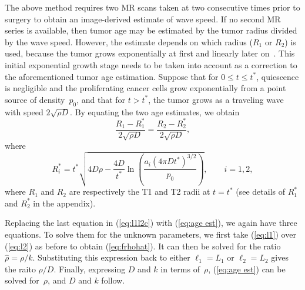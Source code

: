 \documentclass{aims}
\numberwithin{equation}{section}
\begin{document}
The above method requires two MR scans taken at two consecutive times
prior to surgery to obtain an image-derived estimate of wave speed. If no
second MR series is available, then tumor age may be estimated by the
tumor radius divided by the wave speed. However, the estimate depends on
which radius ($R_{1}$ or $R_{2}$) is used, because the tumor grows
exponentially at first and linearly later on~\cite{Kuang}. This
initial exponential growth stage needs to be taken into account as
a correction to the aforementioned tumor age estimation.  Suppose that for
$0\le t\le t^*$, quiescence is negligible and the proliferating cancer cells grow
exponentially from a point source of density~$p_0$, and that for  $t > t^*$,
the tumor grows as a traveling wave with speed $2\sqrt{\rho D}$. 
By equating the two age estimates, we obtain
\begin{equation}
\label{eq:age est}
\frac{R_1-R_1^*}{2\sqrt{\rho D}} =  \frac{R_{2}-R_2^*}{2\sqrt{\rho D}},
\end{equation} 
where 
\begin{equation} \label{eq:Rstar}
R^*_{i} = t^* \sqrt{4D\rho - \frac{4D}{t^*} \ln\left(
  \frac{a_i ( 4\pi D t^*)^{3/2}}{p_0} \right)},\qquad i=1,2,
\end{equation}  
where $R_1$ and $R_2$ are respectively the T1 and T2 radii at $t=t^*$ 
(see details of $R_1^*$ and $R_2^*$ in the appendix). 

Replacing the last equation in (\ref{eq:l1l2c})
with (\ref{eq:age est}), we again have three equations. To solve them
for the unknown parameters, we first take 
(\ref{eq:l1}) over (\ref{eq:l2}) as before to obtain (\ref{eq:frhohat}). 
It can then be solved for the ratio $\hat{\rho}=\rho/k$. Substituting this
expression back to either $\ell_1=L_1$ or $\ell_2=L_2$ gives the raito
$\rho/D$. Finally, expressing $D$ and $k$ in terms of~$\rho$, 
(\ref{eq:age est}) can be solved for~$\rho$, and $D$ and $k$ follow.
\end{document}
